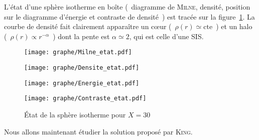 	L'état d'une sphère isotherme en boîte (~diagramme de \textsc{Milne}, densité, position sur le diagramme d'énergie et contraste de densité~)
	est tracée sur la figure~\ref{Sphere}.
	La courbe de densité fait clairement apparaître un cœur (~$\rho(r) \simeq \mathrm{cte}$~) et un halo (~$\rho(r) \varpropto r^{-\alpha}$~) dont la pente est $\alpha \simeq 2$, qui est celle d'une SIS.
	\begin{figure}[ht!]
		\begin{minipage}[b]{0.40\linewidth}
			\centering \texttt{[image: graphe/Milne\_etat.pdf]}
		\end{minipage}\hfill
		\begin{minipage}[b]{0.48\linewidth}
			\centering \texttt{[image: graphe/Densite\_etat.pdf]}
		\end{minipage}
		\begin{minipage}[b]{0.40\linewidth}
			\centering \texttt{[image: graphe/Energie\_etat.pdf]}
		\end{minipage}\hfill
		\begin{minipage}[b]{0.48\linewidth}
			\centering \texttt{[image: graphe/Contraste\_etat.pdf]}
		\end{minipage}
		\caption{État de la sphère isotherme pour $X = 30$}
		\label{Sphere}
	\end{figure}

	Nous allons maintenant étudier la solution proposé par \textsc{King}.
